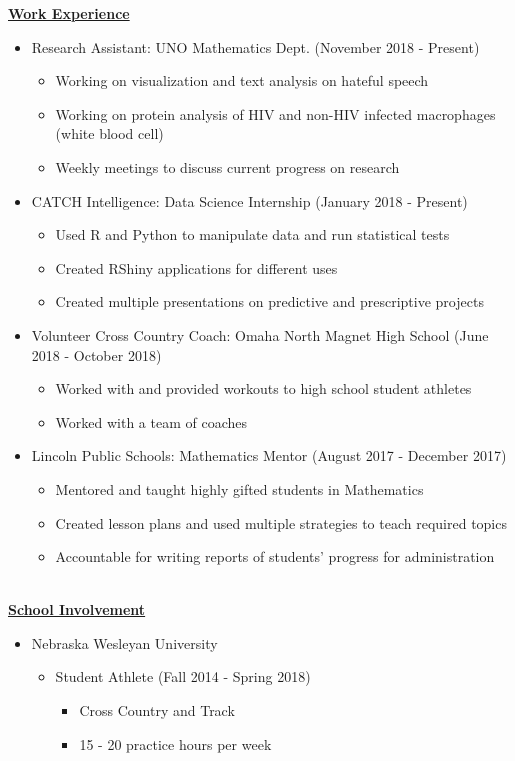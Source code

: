 \documentclass[10pt]{article}
\begin{document}
\underline{\textbf{Work Experience}}
\begin{itemize}
\item Research Assistant: UNO Mathematics Dept. (November 2018 - Present)
\begin{itemize}
\item Working on visualization and text analysis on hateful speech
\item Working on protein analysis of HIV and non-HIV infected macrophages (white blood cell)
\item Weekly meetings to discuss current progress on research
\end{itemize}
\item CATCH Intelligence: Data Science Internship (January 2018 - Present)
\begin{itemize}
\item Used R and Python to manipulate data and run statistical tests
\item Created RShiny applications for different uses
\item Created multiple presentations on predictive and prescriptive projects
\end{itemize}
\item Volunteer Cross Country Coach: Omaha North Magnet High School (June 2018 - October 2018)
\begin{itemize}
\item Worked with and provided workouts to high school student athletes
\item Worked with a team of coaches
\end{itemize}
\item Lincoln Public Schools: Mathematics Mentor (August 2017 - December 2017)
\begin{itemize}
\item Mentored and taught highly gifted students in Mathematics 
\item Created lesson plans and used multiple strategies to teach required topics 
\item Accountable for writing reports of students' progress for administration
\end{itemize}
\end{itemize}
\text{}\\

\underline{\textbf{School Involvement}}

\begin{itemize}
\item Nebraska Wesleyan University
\begin{itemize}
\item Student Athlete (Fall 2014 - Spring 2018)
\begin{itemize}
\item Cross Country and Track
\item 15 - 20 practice hours per week
\end{itemize}
\end{itemize}
\end{itemize}
\text{}\\
\end{document}
